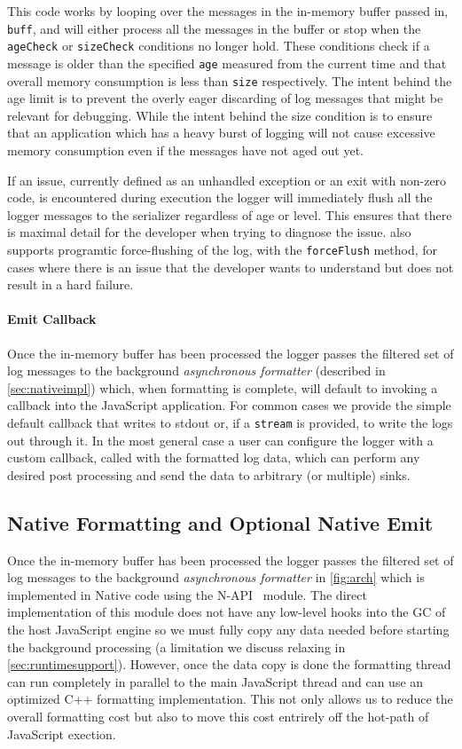 This code works by looping over the messages in the in-memory buffer passed in, 
\lstinline!buff!, and will either process all the messages in the buffer or 
stop when the \lstinline!ageCheck! or \lstinline!sizeCheck! conditions no longer 
hold. These conditions check if a message is older than the specified 
\lstinline!age! measured from the current time and that overall memory 
consumption is less than \lstinline!size! respectively. The intent behind the 
age limit is to prevent the overly eager discarding of log messages that might 
be relevant for debugging. While the intent behind the size condition is to ensure 
that an application which has a heavy burst of logging will not cause excessive 
memory consumption even if the messages have not aged out yet.

If an issue, currently defined as an unhandled exception or an exit with non-zero code, 
is encountered during execution the logger will immediately flush all the logger 
messages to the serializer regardless of age or level. This ensures that there is maximal 
detail for the developer when trying to diagnose the issue. \projn also supports 
programtic force-flushing of the log, with the \texttt{forceFlush} method, for cases where there 
is an issue that the developer wants to understand but does not result in a hard failure. 

\paragraph{Emit Callback}
\noindent
Once the in-memory buffer has been processed the logger passes the filtered set of 
log messages to the background \emph{asynchronous formatter} (described in \autoref{sec:nativeimpl}) 
which, when formatting is complete, will default to invoking a callback into the 
JavaScript application. For common cases we provide the simple default callback that 
writes to stdout or, if a \texttt{stream} is provided, to write the logs out through 
it. In the most general case a user can configure the logger with a custom callback, 
called with the formatted log data, which can perform any desired post processing and 
send the data to arbitrary (or multiple) sinks.

\subsection{Native Formatting and Optional Native Emit}
\label{sec:nativeimpl}
Once the in-memory buffer has been processed the logger passes the filtered set of 
log messages to the background \emph{asynchronous formatter} in \autoref{fig:arch} which 
is implemented in Native code using the N-API~\cite{NAPI} module. The direct 
implementation of this module does not have any low-level hooks into the GC of 
the host JavaScript engine so we must fully copy any data needed before starting 
the background processing (a limitation we discuss relaxing in \autoref{sec:runtimesupport}). 
However, once the data copy is done the formatting thread can run completely in parallel 
to the main JavaScript thread and can use an optimized C++ formatting implementation. This 
not only allows us to reduce the overall formatting cost but also to move this cost 
entrirely off the hot-path of JavaScript exection.


